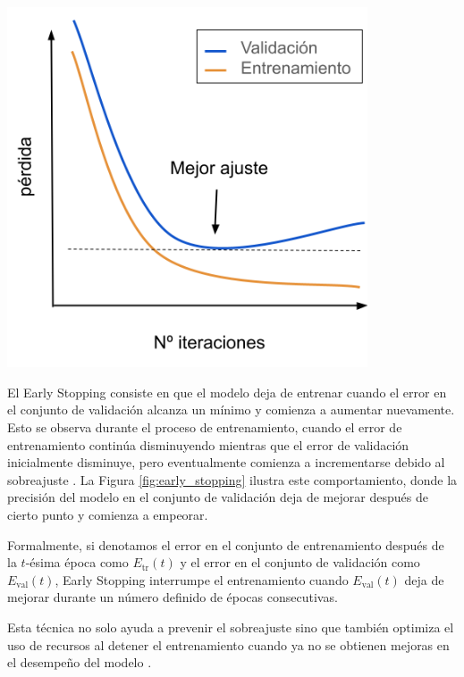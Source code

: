 \begin{minipage}{0.35\textwidth}
\centering
    \includegraphics[width=0.8\textwidth]{img/earlyStopping.png}
    \label{fig:early_stopping}
\end{minipage}
\begin{minipage}{0.6\textwidth}
     El Early Stopping consiste en que el modelo deja de entrenar cuando el error en el conjunto de validación alcanza un mínimo y comienza a aumentar nuevamente. Esto se observa durante el proceso de entrenamiento, cuando el error de entrenamiento continúa disminuyendo mientras que el error de validación inicialmente disminuye, pero eventualmente comienza a incrementarse debido al sobreajuste \citep{geron2022hands}. La Figura \ref{fig:early_stopping} ilustra este comportamiento, donde la precisión del modelo en el conjunto de validación deja de mejorar después de cierto punto y comienza a empeorar.
     
\bigskip

Formalmente, si denotamos el error en el conjunto de entrenamiento después de la \( t \)-ésima época como \( E_{\text{tr}}(t) \) y el error en el conjunto de validación como \( E_{\text{val}}(t) \), Early Stopping interrumpe el entrenamiento cuando \( E_{\text{val}}(t) \) deja de mejorar durante un número definido de épocas consecutivas. 
\end{minipage}


Esta técnica no solo ayuda a prevenir el sobreajuste sino que también optimiza el uso de recursos al detener el entrenamiento cuando ya no se obtienen mejoras en el desempeño del modelo \citep{tian2022comprehensive}.

